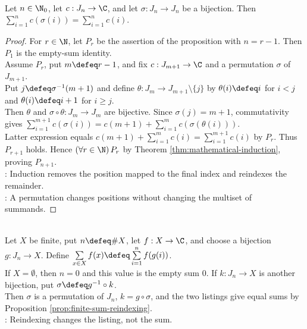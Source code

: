 \begin{proposition} \label{prop:finite-sum-reindexing} \\
Let $n\in\N_0$, let $c:J_n\to\C$, and let $\sigma:J_n\to J_n$ be a bijection. Then $\sum\limits_{i=1}^{n}c(\sigma(i))=\sum\limits_{i=1}^{n}c(i)$.
\begin{proof}
For $r\in\N$, let $P_r$ be the assertion of the proposition with $n=r-1$. Then $P_1$ is the empty-sum identity.\\
Assume $P_r$, put $m\defeq r-1$, and fix $c:J_{m+1}\to\C$ and a permutation $\sigma$ of $J_{m+1}$.\\
Put $j\defeq\sigma^{-1}(m+1)$ and define $\theta:J_m\to J_{m+1}\setminus\{j\}$ by $\theta(i)\defeq i$ for $i<j$ and $\theta(i)\defeq i+1$ for $i\geq j$.\\
Then $\theta$ and $\sigma\circ\theta:J_m\to J_m$ are bijective. Since $\sigma(j)=m+1$, commutativity gives $\sum\limits_{i=1}^{m+1}c(\sigma(i))=c(m+1)+\sum\limits_{i=1}^{m}c(\sigma(\theta(i)))$.\\
Latter expression equals $c(m+1)+\sum\limits_{i=1}^{m}c(i)=\sum\limits_{i=1}^{m+1}c(i)$ by $P_r$. Thus $P_{r+1}$ holds. Hence $(\forall r\in\N)\,P_r$ by Theorem \ref{thm:mathematical-induction}, proving $P_{n+1}$.\\
: Induction removes the position mapped to the final index and reindexes the remainder.\\
: A permutation changes positions without changing the multiset of summands.
\end{proof}
\end{proposition}

\begin{definition} \label{def:finite-set-summation} \\
Let $X$ be finite, put $n\defeq\#X$, let $f:X\to\C$, and choose a bijection $g:J_n\to X$. Define $\sum\limits_{x\in X}f(x)\defeq\sum\limits_{i=1}^{n}f(g(i))$.\\
If $X=\emptyset$, then $n=0$ and this value is the empty sum $0$. If $k:J_n\to X$ is another bijection, put $\sigma\defeq g^{-1}\circ k$.\\
Then $\sigma$ is a permutation of $J_n$, $k=g\circ\sigma$, and the two listings give equal sums by Proposition \ref{prop:finite-sum-reindexing}.\\
: Reindexing changes the listing, not the sum.
\end{definition}

